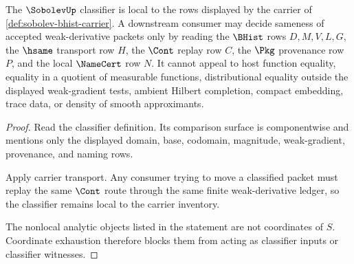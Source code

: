 \begin{theorem}
\label{thm:sobolev-classifier-locality}
The $\SobolevUp$ classifier is local to the rows displayed by the carrier of \autoref{def:sobolev-bhist-carrier}. A downstream consumer may decide sameness of accepted weak-derivative packets only by reading the $\BHist$ rows $D,M,V,L,G$, the $\hsame$ transport row $H$, the $\Cont$ replay row $C$, the $\Pkg$ provenance row $P$, and the local $\NameCert$ row $N$. It cannot appeal to host function equality, equality in a quotient of measurable functions, distributional equality outside the displayed weak-gradient tests, ambient Hilbert completion, compact embedding, trace data, or density of smooth approximants.
\end{theorem}
\begin{proof}
Read the classifier definition. Its comparison surface is componentwise and mentions only the displayed domain, base, codomain, magnitude, weak-gradient, provenance, and naming rows.

Apply carrier transport. Any consumer trying to move a classified packet must replay the same $\Cont$ route through the same finite weak-derivative ledger, so the classifier remains local to the carrier inventory.

The nonlocal analytic objects listed in the statement are not coordinates of $S$. Coordinate exhaustion therefore blocks them from acting as classifier inputs or classifier witnesses.
\end{proof}

